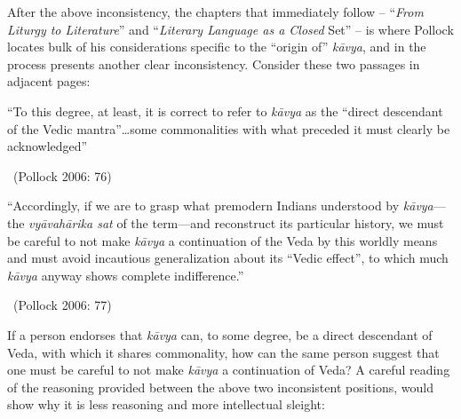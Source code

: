 After the above inconsistency, the chapters that immediately follow – “\textit{From Liturgy to Literature}” and “\textit{Literary Language as a Closed} Set” – is where Pollock locates bulk of his considerations specific to the “origin of” \textit{kāvya}, and in the process presents another clear inconsistency. Consider these two passages in adjacent pages:

\begin{myquote}
“To this degree, at least, it is correct to refer to \textit{kāvya} as the “direct descendant of the Vedic mantra”…some commonalities with what preceded it must clearly be acknowledged” 

~\hfill (Pollock 2006: 76)
\end{myquote}

\begin{myquote}
“Accordingly, if we are to grasp what premodern Indians understood by \textit{kāvya}—the \textit{vyāvahārika sat} of the term—and reconstruct its particular history, we must be careful to not make \textit{kāvya} a continuation of the Veda by this worldly means and must avoid incautious generalization about its “Vedic effect”, to which much \textit{kāvya} anyway shows complete indifference.” 

~\hfill (Pollock 2006: 77)
\end{myquote}

If a person endorses that \textit{kāvya} can, to some degree, be a direct descendant of Veda, with which it shares commonality, how can the same person suggest that one must be careful to not make \textit{kāvya} a continuation of Veda? A careful reading of the reasoning provided between the above two inconsistent positions, would show why it is less reasoning and more intellectual sleight:

